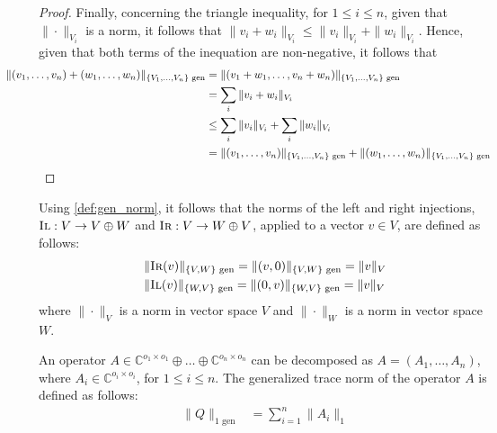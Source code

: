 \begin{proof}
Finally, concerning the triangle inequality, for $ 1 \leq i \leq n$,  given that  $\|\cdot\|_{V_i}$ is a norm, it follows that $\|v_i + w_i\|_{V_i} \leq \|v_i\|_{V_i} + \|w_i\|_{V_i}$. Hence, given that both terms of the inequation are non-negative, it follows that
\begin{align*}
   \hspace {-30pt}\|(v_1, \ldots, v_n) + (w_1, \ldots, w_n)\|_{\{V_1,\ldots,V_n\} \text{ gen}} & = \|(v_1 + w_1, \ldots, v_n + w_n)\|_{\{V_1,\ldots,V_n\} \text{ gen}} \\
  & = \sum_i \|v_i + w_i\|_{V_i} \\
  &\leq \sum_i \|v_i\|_{V_i} + \sum_i \|w_i\|_{V_i} \\
  &=\|(v_1, \ldots, v_n)\|_{\{V_1,\ldots,V_n\} \text{ gen}} + \|(w_1, \ldots, w_n)\|_{\{V_1,\ldots,V_n\} \text{ gen}}  \\
\end{align*}
\end{proof}

Using \autoref{def:gen_norm}, it follows that the norms of the left and right injections, $\textsc{Il}: V \rightarrow V \oplus W$ and $\textsc{Ir}:V \rightarrow W \oplus V$, applied to a vector $v \in V$, are defined as follows:
  \begin{equation} \label{eq:gen_norm_injections}
    \begin{split}
    &\|\textsc{Ir}(v)\|_{\{V, W\} \text{ gen}} =  \| (v,0) \|_{\{ V, W\} \text{ gen}} = \|v\|_{V} \\
    &\|\textsc{Il}(v)\|_{\{ W,  V\} \text{ gen}} =  \| (0,v) \|_{\{ W,  V\} \text{ gen}} = \|v\|_{V}
    \end{split}
  \end{equation}
where $\|\cdot\|_{V}$ is a norm in vector space $V$ and $\|\cdot\|_{W}$ is a norm in vector space $W$.

\begin{definition} \label{def:gen_1norm_matrix}
  An operator $A \in \mathbb{C}^{o_1 \times o_1} \oplus \ldots \oplus \mathbb{C}^{o_ n\times o_n}$ can be decomposed as $A = (A_1, \ldots, A_n)$, where $A_i \in \mathbb{C}^{o_i \times o_i}$, for $1 \leq i \leq n$. The generalized trace norm of the operator $A$ is defined as follows:
\begin{equation}
  \begin{split}
  \|Q\|_{1 \text{ gen}} & = \sum_{i=1}^{n} \|A_i\|_{1} \\
  \end{split}
\end{equation}
\end{definition}
 
